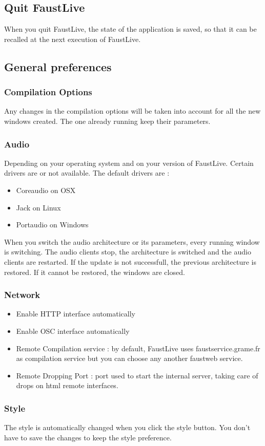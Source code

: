 \documentclass[a4paper]{article}
\begin{document}
\subsection{Quit FaustLive}

When you quit FaustLive, the state of the application is saved, so that it can be recalled at the next execution of FaustLive.

\subsection{General preferences}
\subsubsection{Compilation Options}
Any changes in the compilation options will be taken into account for all the new windows created. The one already running keep their parameters.
\subsubsection{Audio}
 
Depending on your operating system and on your version of FaustLive. Certain drivers are or not available.
The default drivers are :
\begin{itemize}
\item Coreaudio on OSX
\item Jack on Linux
\item Portaudio on Windows
\end{itemize}

When you switch the audio architecture or its parameters, every running window is switching. The audio clients stop, the architecture is switched and the audio clients are restarted. If the update is not successfull, the previous architecture is restored. If it cannot be restored, the windows are closed. 

\subsubsection{Network}
\begin{itemize}
\item Enable HTTP interface automatically
\item Enable OSC interface automatically
\item Remote Compilation service : by default, FaustLive uses faustservice.grame.fr as compilation service but you can choose any another faustweb service.
\item Remote Dropping Port : port used to start the internal server, taking care of drops on html remote interfaces.

\end{itemize}

\subsubsection{Style}
The style is automatically changed when you click the style button. You don't have to save the changes to keep the style preference. 

%
\end{document}
